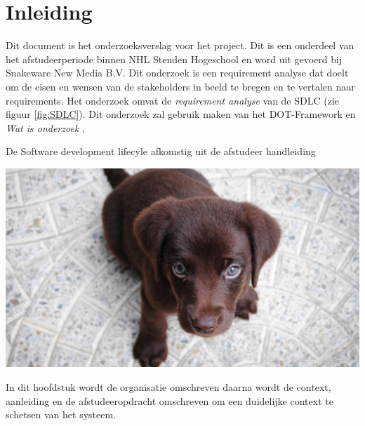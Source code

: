 \chapter{Inleiding}
Dit document is het onderzoeksverslag voor het  project.
Dit is een onderdeel van het afstudeerperiode binnen NHL Stenden Hogeschool en word uit gevoerd bij Snakeware New Media B.V.
Dit onderzoek is een requirement analyse dat doelt om de eisen en wensen van de stakeholders in beeld te bregen en te vertalen naar requirements.
Het onderzoek omvat de \textit{requirement analyse} van de \gls{SDLC} (zie figuur \ref{fig:SDLC}).
Dit onderzoek zal gebruik maken van het DOT-Framework \Parencite{DOT-Framework} en \textit{Wat is onderzoek} \Parencite{Verhoeven}.   \\
\begin{graphic}
    \vspace{0.2cm}
    \captionsetup{type=figure}
    \caption{De Software development lifecyle afkomstig uit de afstudeer handleiding}
    \includegraphics[scale=0.2]{img/Placeholder}
    \label{fig:SDLC}
    \vspace{0.2cm}
\end{graphic}
In dit hoofdstuk wordt de organisatie omschreven daarna wordt de context, aanleiding en de afstudeeropdracht omschreven om een duidelijke context te schetsen van het systeem.



% 
% 
